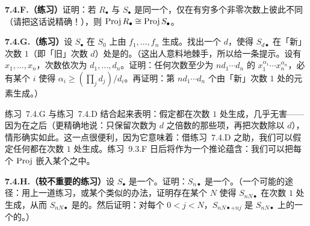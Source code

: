 \textbf{7.4.F.（练习）}\quad 证明：若 $R_\bullet$ 与 $S_\bullet$ 是同一个\trFinitelyGenerated\trGradedRing，仅在有穷多个非零次数上彼此不同（请把这话说精确！），则 $\operatorname{Proj} R_\bullet\cong\operatorname{Proj} S_\bullet$。

\textbf{7.4.G.（练习）}\quad 设 $S_\bullet$ 在 $S_0$ 上由 $f_1,\dots,f_n$ 生成。找出一个 $d$，使得 $S_{d\bullet}$ 在「新」次数 $1$（即「旧」次数 $d$）处是\trFinitelyGenerated{}的。（这出人意料地棘手，所以给一条提示。设有\trGenerator{} $x_1,\dots,x_n$，次数依次为 $d_1,\dots,d_n$。证明：任何次数至少为 $nd_1\cdots d_n$ 的\trMonomial{} $x_1^{\alpha_1}\cdots x_n^{\alpha_n}$，必有某个 $i$ 使得 $\alpha_i\ge(\prod_j d_j)/d_i$。再证明：第 $nd_1\cdots d_n$ 个\trVeroneseSubring{}由「新」次数 $1$ 处的元素生成。）

练习~7.4.G 与练习~7.4.D 结合起来表明：假定\trFinitelyGenerated\trGradedRing{}都在次数 $1$ 处生成，几乎无害——因为在\trRegrading{}之后（更精确地说：只保留次数为 $d$ 之倍数的那些项，再把次数除以 $d$），情形确实如此。这一点很便利，因为它意味着：借练习~7.4.D 之助，我们可以假定任何\trFinitelyGenerated\trGradedRing{}都在次数 $1$ 处生成。\mbox{练习~9.3.F} 日后将作为一个推论蕴含：我们可以把每个 $\operatorname{Proj}$ 嵌入某个\trProjectiveSpace{}之中。

\textbf{7.4.H.（较不重要的练习）}\quad 设 $S_\bullet$ 是一个\trFinitelyGenerated\trGradedRing。证明：$S_{n\bullet}$ 是一个\trFinitelyGenerated\trGradedRing。（一个可能的途径：用上一道练习，或某个类似的办法，证明存在某个 $N$ 使得 $S_{nN\bullet}$ 在次数 $1$ 处生成，从而\trGradedRing{} $S_{nN\bullet}$ 是\trFinitelyGenerated{}的。然后证明：对每个 $0<j<N$，$S_{nN\bullet+nj}$ 是 $S_{nN\bullet}$ 上的一个\trFinitelyGenerated{}的\trModule。）
